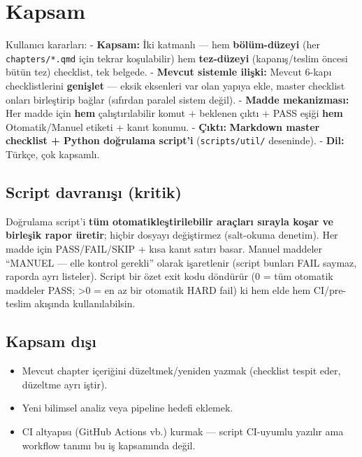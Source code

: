 \documentclass[
  turkish,
  12pt,
  a4paper,
]{report}
\providecommand{\tightlist}{%
  \setlength{\itemsep}{0pt}\setlength{\parskip}{0pt}}
\begin{document}
\section{Kapsam}\label{kapsam}

Kullanıcı kararları: - \textbf{Kapsam:} İki katmanlı --- hem
\textbf{bölüm-düzeyi} (her \texttt{chapters/*.qmd} için tekrar
koşulabilir) hem \textbf{tez-düzeyi} (kapanış/teslim öncesi bütün tez)
checklist, tek belgede. - \textbf{Mevcut sistemle ilişki:} Mevcut 6-kapı
checklistlerini \textbf{genişlet} --- eksik eksenleri var olan yapıya
ekle, master checklist onları birleştirip bağlar (sıfırdan paralel
sistem değil). - \textbf{Madde mekanizması:} Her madde için \textbf{hem}
çalıştırılabilir komut + beklenen çıktı + PASS eşiği \textbf{hem}
Otomatik/Manuel etiketi + kanıt konumu. - \textbf{Çıktı:}
\textbf{Markdown master checklist + Python doğrulama script'i}
(\texttt{scripts/util/} deseninde). - \textbf{Dil:} Türkçe, çok
kapsamlı.

\subsection{Script davranışı
(kritik)}\label{script-davranux131ux15fux131-kritik}

Doğrulama script'i \textbf{tüm otomatikleştirilebilir araçları sırayla
koşar ve birleşik rapor üretir}; hiçbir dosyayı değiştirmez (salt-okuma
denetim). Her madde için PASS/FAIL/SKIP + kısa kanıt satırı basar.
Manuel maddeler ``MANUEL --- elle kontrol gerekli'' olarak işaretlenir
(script bunları FAIL saymaz, raporda ayrı listeler). Script bir özet
exit kodu döndürür (0 = tüm otomatik maddeler PASS; \textgreater0 = en
az bir otomatik HARD fail) ki hem elde hem CI/pre-teslim akışında
kullanılabilsin.

\subsection{Kapsam dışı}\label{kapsam-dux131ux15fux131}

\begin{itemize}
\tightlist
\item
  Mevcut chapter içeriğini düzeltmek/yeniden yazmak (checklist tespit
  eder, düzeltme ayrı iştir).
\item
  Yeni bilimsel analiz veya pipeline hedefi eklemek.
\item
  CI altyapısı (GitHub Actions vb.) kurmak --- script CI-uyumlu yazılır
  ama workflow tanımı bu iş kapsamında değil.
\end{itemize}
\end{document}
